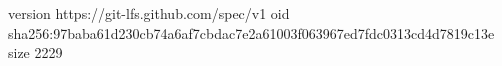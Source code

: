 version https://git-lfs.github.com/spec/v1
oid sha256:97baba61d230cb74a6af7cbdac7e2a61003f063967ed7fdc0313cd4d7819c13e
size 2229
